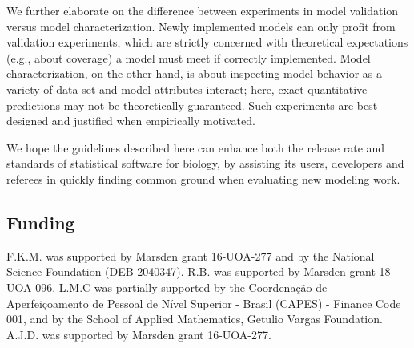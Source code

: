 \documentclass[oneside]{article}
\begin{document}
We further elaborate on the difference between experiments in model validation versus model characterization.
Newly implemented models can only profit from validation experiments, which are strictly concerned with theoretical expectations (e.g., about coverage) a model must meet if correctly implemented.
Model characterization, on the other hand, is about inspecting model behavior as a variety of data set and model attributes interact; here, exact quantitative predictions may not be theoretically guaranteed.
Such experiments are best designed and justified when empirically motivated.

We hope the guidelines described here can enhance both the release rate and standards of statistical software for biology, by assisting its users, developers and referees in quickly finding common ground when evaluating new modeling work.


\subsection*{Funding}
F.K.M. was supported by Marsden grant 16-UOA-277 and by the National Science Foundation (DEB-2040347).
R.B. was supported by Marsden grant 18-UOA-096.
L.M.C was partially supported by the Coordenação de Aperfeiçoamento de
Pessoal de Nível Superior - Brasil (CAPES) - Finance Code 001, and by the School of Applied Mathematics,  Getulio Vargas Foundation.
A.J.D. was supported by Marsden grant 16-UOA-277.






\end{document}
